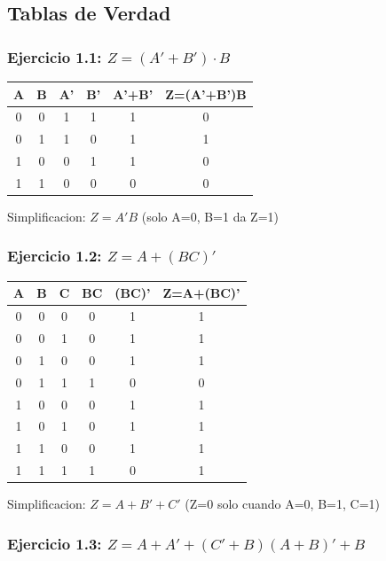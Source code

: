 \documentclass[12pt,a4paper]{article}
\begin{document}
\subsection{Tablas de Verdad}

\subsubsection{Ejercicio 1.1: $Z = (A' + B') \cdot B$}

\begin{center}
\begin{tabular}{|c|c|c|c|c|c|}
\hline
A & B & A' & B' & A'+B' & Z=(A'+B')B \\
\hline
0 & 0 & 1 & 1 & 1 & 0 \\
0 & 1 & 1 & 0 & 1 & 1 \\
1 & 0 & 0 & 1 & 1 & 0 \\
1 & 1 & 0 & 0 & 0 & 0 \\
\hline
\end{tabular}
\end{center}

Simplificacion: $Z = A'B$ (solo A=0, B=1 da Z=1)

\subsubsection{Ejercicio 1.2: $Z = A + (BC)'$}

\begin{center}
\begin{tabular}{|c|c|c|c|c|c|}
\hline
A & B & C & BC & (BC)' & Z=A+(BC)' \\
\hline
0 & 0 & 0 & 0 & 1 & 1 \\
0 & 0 & 1 & 0 & 1 & 1 \\
0 & 1 & 0 & 0 & 1 & 1 \\
0 & 1 & 1 & 1 & 0 & 0 \\
1 & 0 & 0 & 0 & 1 & 1 \\
1 & 0 & 1 & 0 & 1 & 1 \\
1 & 1 & 0 & 0 & 1 & 1 \\
1 & 1 & 1 & 1 & 0 & 1 \\
\hline
\end{tabular}
\end{center}

Simplificacion: $Z = A + B' + C'$ (Z=0 solo cuando A=0, B=1, C=1)

\subsubsection{Ejercicio 1.3: $Z = A + A' + (C' + B)(A + B)' + B$}
\end{document}
